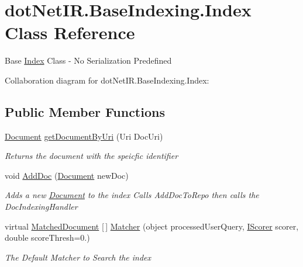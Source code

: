 \hypertarget{classdot_net_i_r_1_1_base_indexing_1_1_index}{}\section{dot\+Net\+I\+R.\+Base\+Indexing.\+Index Class Reference}
\label{classdot_net_i_r_1_1_base_indexing_1_1_index}


Base \hyperlink{classdot_net_i_r_1_1_base_indexing_1_1_index}{Index} Class -\/ No Serialization Predefined  




Collaboration diagram for dot\+Net\+I\+R.\+Base\+Indexing.\+Index\+:
\subsection*{Public Member Functions}
\begin{DoxyCompactItemize}
\item 
\hyperlink{classdot_net_i_r_1_1_base_indexing_1_1_document}{Document} \hyperlink{classdot_net_i_r_1_1_base_indexing_1_1_index_a47412de8014e09501bbd8bb20fae4f25}{get\+Document\+By\+Uri} (Uri Doc\+Uri)
\begin{DoxyCompactList}\small\item\em Returns the document with the speicfic identifier \end{DoxyCompactList}\item 
void \hyperlink{classdot_net_i_r_1_1_base_indexing_1_1_index_a4e96cd46ae19e5946767c0c1eb67b992}{Add\+Doc} (\hyperlink{classdot_net_i_r_1_1_base_indexing_1_1_document}{Document} new\+Doc)
\begin{DoxyCompactList}\small\item\em Adds a new \hyperlink{classdot_net_i_r_1_1_base_indexing_1_1_document}{Document} to the index Calls Add\+Doc\+To\+Repo then calls the Doc\+Indexing\+Handler \end{DoxyCompactList}\item 
virtual \hyperlink{classdot_net_i_r_1_1_base_querying_1_1_matched_document}{Matched\+Document} \mbox{[}$\,$\mbox{]} \hyperlink{classdot_net_i_r_1_1_base_indexing_1_1_index_a068d3ddbddbd4ea9031a58a61af8bdfb}{Matcher} (object processed\+User\+Query, \hyperlink{interfacedot_net_i_r_1_1_base_querying_1_1_i_scorer}{I\+Scorer} scorer, double score\+Thresh=0.)
\begin{DoxyCompactList}\small\item\em The Default Matcher to Search the index \end{DoxyCompactList}\end{DoxyCompactItemize}
